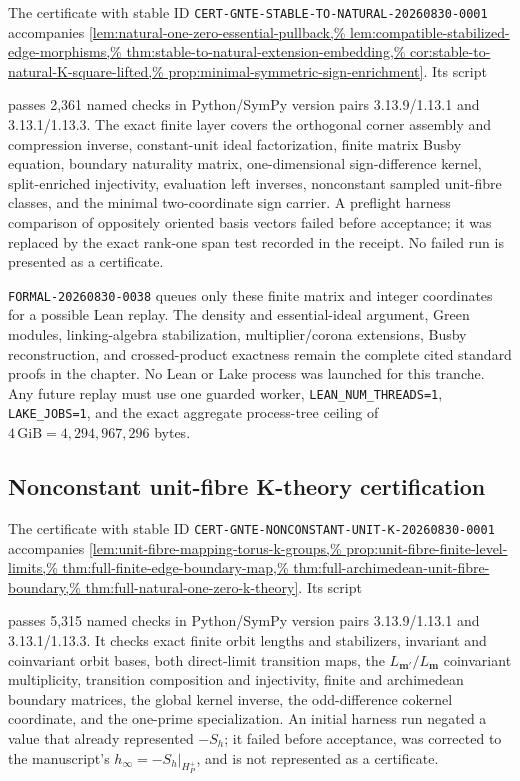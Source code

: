 The certificate with stable ID
\texttt{CERT-GNTE-STABLE-TO-NATURAL-20260830-0001} accompanies
\cref{lem:natural-one-zero-essential-pullback,%
lem:compatible-stabilized-edge-morphisms,%
thm:stable-to-natural-extension-embedding,%
cor:stable-to-natural-K-square-lifted,%
prop:minimal-symmetric-sign-enrichment}.
Its script
\begin{center}\small
{}%
\end{center}
passes 2,361 named checks in Python/SymPy version pairs
3.13.9/1.13.1 and 3.13.1/1.13.3.  The exact finite layer covers the
orthogonal corner assembly and compression inverse, constant-unit ideal
factorization, finite matrix Busby equation, boundary naturality matrix,
one-dimensional sign-difference kernel, split-enriched injectivity,
evaluation left inverses, nonconstant sampled unit-fibre classes, and the
minimal two-coordinate sign carrier.  A preflight harness comparison of
oppositely oriented basis vectors failed before acceptance; it was replaced
by the exact rank-one span test recorded in the receipt.  No failed run is
presented as a certificate.

\texttt{FORMAL-20260830-0038} queues only these finite matrix and integer
coordinates for a possible Lean replay.  The density and essential-ideal
argument, Green modules, linking-algebra stabilization, multiplier/corona
extensions, Busby reconstruction, and crossed-product exactness remain the
complete cited standard proofs in the chapter.  No Lean or Lake process was
launched for this tranche.  Any future replay must use one guarded worker,
\texttt{LEAN\_NUM\_THREADS=1}, \texttt{LAKE\_JOBS=1}, and the exact aggregate
process-tree ceiling of $4\,\mathrm{GiB}=4{,}294{,}967{,}296$ bytes.

\subsection{Nonconstant unit-fibre K-theory certification}

The certificate with stable ID
\texttt{CERT-GNTE-NONCONSTANT-UNIT-K-20260830-0001} accompanies
\cref{lem:unit-fibre-mapping-torus-k-groups,%
prop:unit-fibre-finite-level-limits,%
thm:full-finite-edge-boundary-map,%
thm:full-archimedean-unit-fibre-boundary,%
thm:full-natural-one-zero-k-theory}.
Its script
\begin{center}\small
{}%
\end{center}
passes 5,315 named checks in Python/SymPy version pairs
3.13.9/1.13.1 and 3.13.1/1.13.3.  It checks exact finite orbit lengths and
stabilizers, invariant and coinvariant orbit bases, both direct-limit
transition maps, the \(L_{\mathbf m'}/L_{\mathbf m}\) coinvariant
multiplicity, transition composition and injectivity, finite and
archimedean boundary matrices, the global kernel inverse, the odd-difference
cokernel coordinate, and the one-prime specialization.  An initial harness
run negated a value that already represented \(-S_h\); it failed before
acceptance, was corrected to the manuscript's
\(h_\infty=-S_h|_{H_P^+}\), and is not represented as a certificate.

